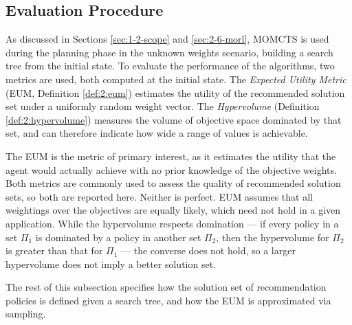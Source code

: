 \subsection{Evaluation Procedure} 
\label{sec:5-5-2-eval_procedure}

    As discussed in Sections \ref{sec:1-2-scope} and \ref{sec:2-6-morl}, MOMCTS is used during the planning phase in the unknown weights scenario, building a search tree from the initial state. To evaluate the performance of the algorithms, two metrics are used, both computed at the initial state. The \textit{Expected Utility Metric} (EUM, Definition \ref{def:2:eum}) estimates the utility of the recommended solution set under a uniformly random weight vector. The \textit{Hypervolume} (Definition \ref{def:2:hypervolume}) measures the volume of objective space dominated by that set, and can therefore indicate how wide a range of values is achievable.
    
    The EUM is the metric of primary interest, as it estimates the utility that the agent would actually achieve with no prior knowledge of the objective weights. Both metrics are commonly used to assess the quality of recommended solution sets, so both are reported here. Neither is perfect. EUM assumes that all weightings over the objectives are equally likely, which need not hold in a given application. While the hypervolume respects domination --- if every policy in a set $\Pi_1$ is dominated by a policy in another set $\Pi_2$, then the hypervolume for $\Pi_2$ is greater than that for $\Pi_1$ --- the converse does not hold, so a larger hypervolume does not imply a better solution set.

    The rest of this subsection specifies how the solution set of recommendation policies is defined given a search tree, and how the EUM is approximated via sampling.


